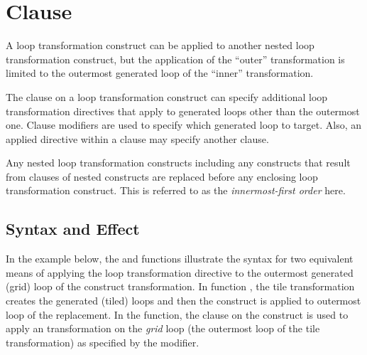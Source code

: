 \section{ Clause}
\label{sec:apply_clause}



A loop transformation construct can be applied to another nested
loop transformation construct, but the application of the ``outer'' transformation
is limited to the outermost generated loop of the ``inner'' transformation.

The  clause on a loop transformation construct can specify additional
loop transformation directives that apply to generated loops other than the outermost one.
Clause modifiers are used to specify which generated loop to target.
Also, an applied directive within a clause may specify another  clause.


Any nested loop transformation constructs including any constructs that
result from  clauses of nested constructs are replaced before any enclosing
loop transformation construct. This is referred to as the \emph{innermost-first order}
here.

\subsection{Syntax and Effect}

In the example below, the  and  functions
illustrate the syntax for two equivalent means of applying the  loop transformation
directive to the outermost generated (grid) loop of the  construct transformation.
In function , the tile transformation creates the generated (tiled) loops
and then the  construct is applied to outermost loop of the replacement.
In the  function, the  clause on the  construct
is used to apply an  transformation on the \emph{grid} loop (the outermost loop
of the tile transformation) as specified by the  modifier.

